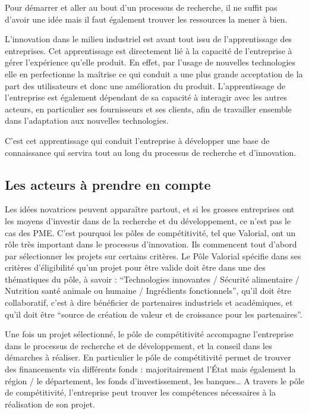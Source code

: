 \documentclass[a4paper,12pt]{report}
\begin{document}
			Pour démarrer et aller au bout d’un processus de recherche, il ne suffit pas d’avoir une idée mais il faut également trouver les ressources la mener à bien.
			
			L’innovation dans le milieu industriel est avant tout issu de l’apprentissage des entreprises. Cet apprentissage est directement lié à la capacité de l’entreprise à gérer l’expérience qu’elle produit. En effet, par l’usage de nouvelles technologies elle en perfectionne la maîtrise ce qui conduit a une plus grande acceptation de la part des utilisateurs et donc une amélioration du produit. 
			L’apprentissage de l’entreprise est également dépendant de sa capacité à interagir avec les autres acteurs, en particulier ses fournisseurs et ses clients, afin de travailler ensemble dans l’adaptation aux nouvelles technologies.
			
			C’est cet apprentissage qui conduit l’entreprise à développer une base de connaissance qui servira tout au long du processus de recherche et d’innovation.
			
		\subsection{Les acteurs à prendre en compte}
			Les idées novatrices peuvent apparaître partout, et si les grosses entreprises ont les moyens d’investir dans de la recherche et du développement, ce n’est pas le cas des PME. C’est pourquoi les pôles de compétitivité, tel que Valorial, ont un rôle très important dans le processus d’innovation. Ils commencent tout d’abord par sélectionner les projets sur certains critères. Le Pôle Valorial spécifie dans ses critères d’éligibilité\cite{Eligibilite} qu’un projet pour être valide doit être dans une des thématiques du pôle, à savoir : “Technologies innovantes / Sécurité alimentaire / Nutrition santé animale ou humaine / Ingrédients fonctionnels”, qu’il doit être collaboratif, c’est à dire bénéficier de partenaires industriels et académiques, et qu’il doit être “source de création de valeur et de croissance pour les partenaires”.
			
			Une fois un projet sélectionné, le pôle de compétitivité accompagne l’entreprise dans le processus de recherche et de développement, et la conseil dans les démarches à réaliser. En particulier le pôle de compétitivité permet de trouver des financements via différents fonds : majoritairement l’État mais également la région / le département, les fonds d’investissement, les banques…
			A travers le pôle de compétitivité, l’entreprise peut trouver les compétences nécessaires à la réalisation de son projet.
				
\end{document}

